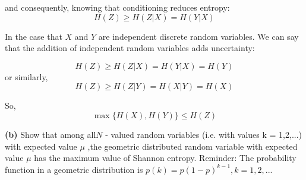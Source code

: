 \documentclass[11pt]{article}
\makeatletter
\newenvironment{proofw}{\par
	\pushQED{\qed}%
	\normalfont \topsep6\p@\@plus6\p@\relax
	\trivlist
	\item[]\ignorespaces
}{%
	\popQED\endtrivlist\@endpefalse
}
\makeatother
\begin{document}
\begin{proofw}
and consequently, knowing that conditioning reduces entropy:
\begin{equation*}
H(Z) \geq H(Z|X) = H(Y|X)  
\end{equation*}

In the case that $X$ and $Y$ are independent discrete random variables. We can say that the addition of independent random variables adds uncertainty:

\begin{equation*}
H(Z) \geq H(Z|X) = H(Y|X) = H(Y)
\end{equation*}
or similarly,
\begin{equation*}
H(Z) \geq H(Z|Y) = H(X|Y) = H(X)
\end{equation*}

So, 
\begin{equation*}
\max \{ H(X), H(Y)\} \leq H(Z)
\end{equation*}

\end{proofw}
\begin{tcolorbox}
\textbf{(b)}
Show that among all\quad $N$ - valued random variables (i.e. with values
k = 1,2,...) with expected value $\mu$ ,the geometric distributed random variable
with expected value $\mu$ has the maximum value of Shannon entropy.
Reminder: The probability function in a geometric distribution is
$p(k) = {p(1 - p)}^{k-1}, k = 1,2,...$
	
\end{tcolorbox}
\end{document}
